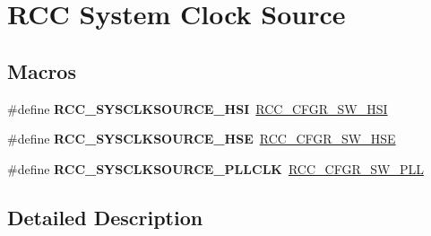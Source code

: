 \hypertarget{group___r_c_c___system___clock___source}{}\section{R\+CC System Clock Source}
\label{group___r_c_c___system___clock___source}
\subsection*{Macros}
\begin{DoxyCompactItemize}
\item 
\mbox{\label{group___r_c_c___system___clock___source_gaaeeb699502e7d7a9f1b5d57fcf1f5095}} 
\#define {\bfseries R\+C\+C\+\_\+\+S\+Y\+S\+C\+L\+K\+S\+O\+U\+R\+C\+E\+\_\+\+H\+SI}~\mbox{\hyperlink{group___peripheral___registers___bits___definition_gacbac8bae4f0808b3c3a5185aa10081fb}{R\+C\+C\+\_\+\+C\+F\+G\+R\+\_\+\+S\+W\+\_\+\+H\+SI}}
\item 
\mbox{\label{group___r_c_c___system___clock___source_ga9116d0627e1e7f33c48e1357b9a35a1c}} 
\#define {\bfseries R\+C\+C\+\_\+\+S\+Y\+S\+C\+L\+K\+S\+O\+U\+R\+C\+E\+\_\+\+H\+SE}~\mbox{\hyperlink{group___peripheral___registers___bits___definition_gafb563f217242d969f4355d0818fde705}{R\+C\+C\+\_\+\+C\+F\+G\+R\+\_\+\+S\+W\+\_\+\+H\+SE}}
\item 
\mbox{\label{group___r_c_c___system___clock___source_ga5caf08ac71d7dd7e7b2e3e421606aca7}} 
\#define {\bfseries R\+C\+C\+\_\+\+S\+Y\+S\+C\+L\+K\+S\+O\+U\+R\+C\+E\+\_\+\+P\+L\+L\+C\+LK}~\mbox{\hyperlink{group___peripheral___registers___bits___definition_ga87389cacb2eaf53730da13a2a33cd487}{R\+C\+C\+\_\+\+C\+F\+G\+R\+\_\+\+S\+W\+\_\+\+P\+LL}}
\end{DoxyCompactItemize}


\subsection{Detailed Description}
